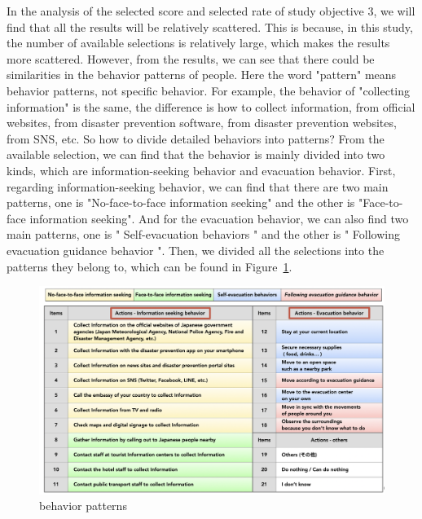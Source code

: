 In the analysis of the selected score and selected rate of study objective 3, we will find that all the results will be relatively scattered. This is because, in this study, the number of available selections is relatively large, which makes the results more scattered. However, from the results, we can see that there could be similarities in the behavior patterns of people. Here the word "pattern" means behavior patterns, not specific behavior. For example, the behavior of  "collecting information" is the same, the difference is how to collect information, from official websites, from disaster prevention software, from disaster prevention websites, from SNS, etc. So how to divide detailed behaviors into patterns? From the available selection, we can find that the behavior is mainly divided into two kinds, which are information-seeking behavior and evacuation behavior. First, regarding information-seeking behavior, we can find that there are two main patterns, one is "No-face-to-face information seeking" and the other is "Face-to-face information seeking". And for the evacuation behavior, we can also find two main patterns, one is " Self-evacuation behaviors " and the other is " Following evacuation guidance behavior ". Then, we divided all the selections into the patterns they belong to, which can be found in Figure~\ref{fig12}.

\begin{figure}[h]
  \includegraphics[width=\linewidth]{Figure/Figure12.png}
  \centering
  \caption{behavior patterns}
  \label{fig12}
\end{figure}

